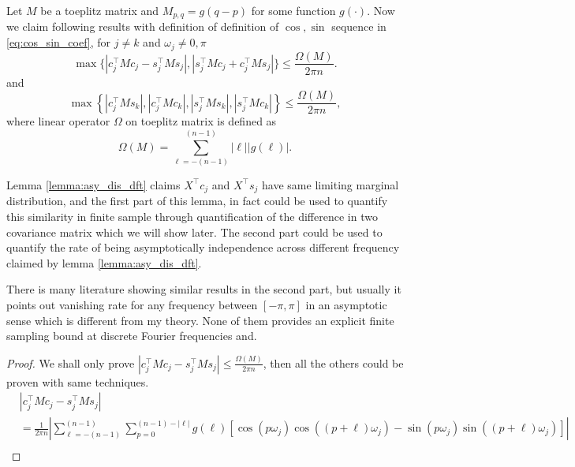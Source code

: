 \begin{lem}
\label{lemma: bound_toeplitz}
Let $M$ be a toeplitz matrix and $M_{p,q} = g(q-p)$ for some function $g(\cdot)$. Now we claim following results with definition of definition of $\cos, \sin$ sequence in \ref{eq:cos_sin_coef}, for $j\neq k$ and $\omega_j \neq 0, \pi$
\begin{equation*}
\max\{|c_j^\top M c_j - s_j^\top M s_j|, |s_j^\top M c_j + c_j^\top M s_j|\}\le \frac{\Omega(M)}{2\pi n}.
\end{equation*}
and 
\begin{equation*}
\max\left\{|c_j^\top M s_k|, |c_j^\top M c_k|, |s_j^\top M s_k|, |s_j^\top M c_k|\right\} \le \frac{\Omega(M)}{2\pi n},
\end{equation*}
where linear operator $\Omega$ on toeplitz matrix is defined as 
\begin{equation}
\Omega(M) = \sum_{\ell = -(n-1)}^{(n-1)} |\ell| |g(\ell)|.   
\end{equation}
\begin{remark}
Lemma \ref{lemma:asy_dis_dft} claims $X^\top c_j$ and $X^\top s_j$ have same limiting marginal distribution, 
and the first part of this lemma, in fact could be used to quantify this similarity in finite sample through quantification of the difference in two covariance matrix
which we will show later. The second part could be used to quantify the rate of being asymptotically independence across different frequency claimed by lemma \ref{lemma:asy_dis_dft}. \par 
There is many literature showing similar results in the second part, but usually it points out vanishing rate for any frequency between $[-\pi, \pi]$ in an asymptotic sense which is different from my theory. None of them provides an explicit finite sampling bound at discrete Fourier frequencies and. 
\end{remark}
\begin{proof}
We shall only prove $|c_j^\top M c_j - s_j^\top M s_j|\le \frac{\Omega(M)}{2\pi n}$, then all the others could be proven with same techniques. %
\begin{equation}
\label{eq:similarity_real_im}
\begin{aligned}
 &|c_j^\top M c_j - s_j^\top M s_j| \\
 &=\frac{1}{2\pi n}\left|\sum_{\ell=-(n-1)}^{(n-1)} \sum_{p=0}^{(n-1)-\left|\ell\right|} g(\ell)\left[ \cos(p\omega_j)\cos((p+\ell)\omega_j) - \sin(p\omega_j)\sin((p+\ell)\omega_j)\right]\right|\\

\end{aligned}
\end{equation}
\end{proof}
\end{lem}
